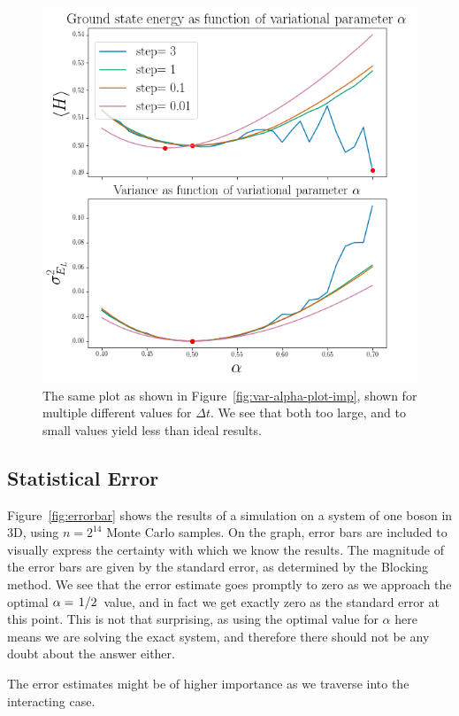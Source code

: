 \documentclass[a4paper, 11pt]{article}
\begin{document}
\begin{figure}[!h]
    \centering
    \includegraphics[width=0.9\linewidth]{../results/var-alpha-plot-imp-dts-50000.png}
    \caption{The same plot as shown in Figure~\ref{fig:var-alpha-plot-imp},
    shown for multiple different values for $\Delta t$. We see that both too
    large, and to small values yield less than ideal results.}
    \label{fig:var-alpha-plot-imp-dts}
\end{figure}
\begin{multicols}{2}

\subsection{Statistical Error}

Figure~\ref{fig:errorbar} shows the results of a simulation on a system of one
boson in 3D, using $n=2^{14}$ Monte Carlo samples. On the graph, error bars are
included to visually express the certainty with which we know the results. The
magnitude of the error bars are given by the standard error, as determined by
the Blocking method. We see that the error estimate goes promptly to zero as we
approach the optimal $\alpha=\flatfrac{1}{2}$ value, and in fact we get exactly
zero as the standard error at this point. This is not that surprising, as using
the optimal value for $\alpha$ here means we are solving the exact system, and
therefore there should not be any doubt about the answer either.

The error estimates might be of higher importance as we traverse into the
interacting case.
\end{multicols}
\end{document}
